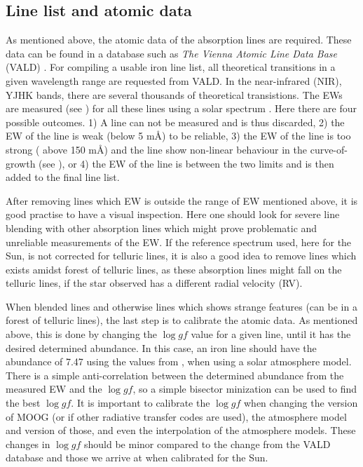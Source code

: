 \subsection{Line list and atomic data}
\label{sec:linelist}

As mentioned above, the atomic data of the absorption lines are required. These
data can be found in a database such as \emph{The Vienna Atomic Line Data Base}
(VALD) \citep{VALD1,VALD2}. For compiling a usable iron line list, all
theoretical transitions in a given wavelength range are requested from VALD. In
the near-infrared (NIR), YJHK bands, there are several thousands of theoretical
transistions. The EWs are measured (see ) for all these
lines using a solar spectrum \citep[][is used here]{Hinkle1995}. Here there are
four possible outcomes. 1) A line can not be measured and is thus discarded, 2)
the EW of the line is weak (below 5 m\AA{}) to be reliable, 3) the EW of the
line is too strong ( above 150 m\AA{}) and the line show non-linear behaviour in
the curve-of-growth (see ), or 4) the EW of the line is between
the two limits and is then added to the final line list.

After removing lines which EW is outside the range of EW mentioned above, it is
good practise to have a visual inspection. Here one should look for severe line
blending with other absorption lines which might prove problematic and
unreliable measurements of the EW. If the reference spectrum used, here for the
Sun, is not corrected for telluric lines, it is also a good idea to remove lines
which exists amidst forest of telluric lines, as these absorption lines might
fall on the telluric lines, if the star observed has a different radial velocity
(RV).

When blended lines and otherwise lines which shows strange features (can be in a
forest of telluric lines), the last step is to calibrate the atomic data. As
mentioned above, this is done by changing the $\log \mathit{gf}$ value for a
given line, until it has the desired determined abundance. In this case, an iron
line should have the abundance of 7.47 using the values from
\citet{Gonzalez2000}, when using a solar atmosphere model. There is a simple
anti-correlation between the determined abundance from the measured EW and the
$\log \mathit{gf}$, so a simple bisector minization can be used to find the best
$\log \mathit{gf}$. It is important to calibrate the $\log \mathit{gf}$ when
changing the version of MOOG (or if other radiative transfer codes are used),
the atmosphere model and version of those, and even the interpolation of the
atmosphere models. These changes in $\log \mathit{gf}$ should be minor compared
to the change from the VALD database and those we arrive at when calibrated for
the Sun.



